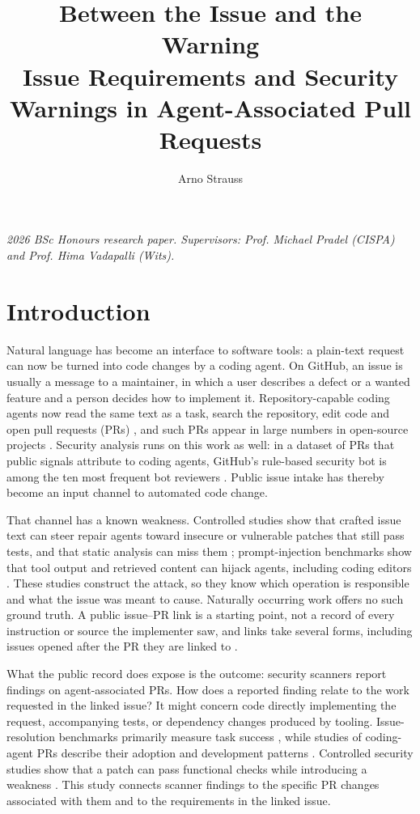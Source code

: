 \documentclass[acmsmall,screen,nonacm]{acmart}
\title[Between the Issue and the Warning]{Between the Issue and the Warning\texorpdfstring{\\[0.25em]}{ }Issue Requirements and Security Warnings in Agent-Associated Pull Requests}
\author{Arno Strauss}
\affiliation{\institution{School of Computer Science and Applied Mathematics, University of the Witwatersrand}\city{Johannesburg}\country{South Africa}}
\begin{document}
\maketitle
\noindent\textit{2026 BSc Honours research paper. Supervisors: Prof. Michael Pradel (CISPA) and Prof. Hima Vadapalli (Wits).}

\section{Introduction}

Natural language has become an interface to software tools: a plain-text request can now be turned into code changes by a coding agent. On GitHub, an issue is usually a message to a maintainer, in which a user describes a defect or a wanted feature and a person decides how to implement it. Repository-capable coding agents now read the same text as a task, search the repository, edit code and open pull requests (PRs) \cite{b9,b20,b22,b25}, and such PRs appear in large numbers in open-source projects \cite{b11,b21}. Security analysis runs on this work as well: in a dataset of PRs that public signals attribute to coding agents, GitHub's rule-based security bot is among the ten most frequent bot reviewers \cite{b11}. Public issue intake has thereby become an input channel to automated code change.

That channel has a known weakness. Controlled studies show that crafted issue text can steer repair agents toward insecure or vulnerable patches that still pass tests, and that static analysis can miss them \cite{b3,b16}; prompt-injection benchmarks show that tool output and retrieved content can hijack agents, including coding editors \cite{b6,b12,b24}. These studies construct the attack, so they know which operation is responsible and what the issue was meant to cause. Naturally occurring work offers no such ground truth. A public issue--PR link is a starting point, not a record of every instruction or source the implementer saw, and links take several forms, including issues opened after the PR they are linked to \cite{b5}.

What the public record does expose is the outcome: security scanners report findings on agent-associated PRs. How does a reported finding relate to the work requested in the linked issue? It might concern code directly implementing the request, accompanying tests, or dependency changes produced by tooling. Issue-resolution benchmarks primarily measure task success \cite{b9}, while studies of coding-agent PRs describe their adoption and development patterns \cite{b11,b21}. Controlled security studies show that a patch can pass functional checks while introducing a weakness \cite{b3,b35}. This study connects scanner findings to the specific PR changes associated with them and to the requirements in the linked issue.
\end{document}
